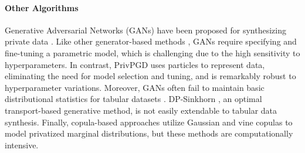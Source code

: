 
\paragraph{Other Algorithms} Generative Adversarial Networks (GANs) have been proposed for synthesizing private data \citep{xie2018differentially, jordon2019pate, torkzadehmahani2019dp}. Like other generator-based methods \citep{liu2021iterative, vero2023programmable}, GANs require specifying and fine-tuning a parametric model, which is challenging due to the high sensitivity to hyperparameters. In contrast, PrivPGD uses particles to represent data, eliminating the need for model selection and tuning, and is remarkably robust to hyperparameter variations. Moreover, GANs often fail to maintain basic distributional statistics for tabular datasets \citep{tao2021benchmarking}. DP-Sinkhorn \citep{cao2021don}, an optimal transport-based generative method, is not easily extendable to tabular data synthesis. Finally, copula-based approaches \citep{li2014differentially, asghar2019differentially, gambs2021growing} utilize Gaussian and vine copulas to model privatized marginal distributions, but these methods are computationally intensive.
